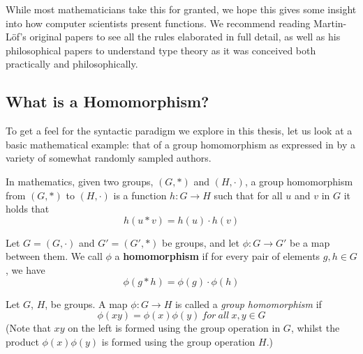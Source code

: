 While most mathematicians take this for granted, we hope this gives some insight
into how computer scientists present functions. We recommend reading
Martin-Löf's original papers \cite{ml1984} \cite{ml79} to see all the rules
elaborated in full detail, as well as his philosophical papers
\cite{mlMeanings} \cite{mlTruth} to understand type theory as it was conceived
both practically and philosophically.


\subsection{What is a Homomorphism?} \label{homo}

To get a feel for the syntactic paradigm we explore in this thesis, let us look at a basic mathematical
example: that of a group homomorphism as expressed in by a variety of somewhat
randomly sampled authors.  


\begin{definition}
In mathematics, given two groups, $(G, \ast)$ and $(H, \cdot)$, a group homomorphism from $(G, \ast)$ to $(H, \cdot)$ is a function $h : G \to H$ such that for all $u$ and $v$ in $G$ it holds that
  $$h(u \ast v) = h ( u ) \cdot h ( v )$$ 
\end{definition}


\begin{definition}
Let $G = (G,\cdot)$ and $G' = (G',\ast)$ be groups, and let $\phi : G \to G'$ be a map between them. We call $\phi$ a \textbf{homomorphism} if for every pair of elements $g, h \in G$, we have 
  $$\phi(g \ast h) = \phi ( g ) \cdot \phi ( h )$$ 
\end{definition}


\begin{definition}\label{def:def3}
Let $G$, $H$, be groups.  A map $\phi : G \to H$ is called a \emph{group homomorphism} if
  $$\phi(xy) = \phi ( x ) \phi ( y )\ for\ all\ x, y \in G$$ 
(Note that $xy$ on the left is formed using the group operation in $G$, whilst the product $\phi ( x ) \phi ( y )$ is formed using the group operation $H$.)
\end{definition}

